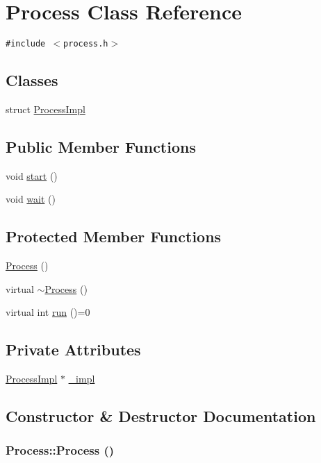 \hypertarget{classProcess}{
\section{Process Class Reference}
\label{classProcess}
}
{\tt \#include $<$process.h$>$}

\subsection*{Classes}
\begin{CompactItemize}
\item 
struct \hyperlink{structProcess_1_1ProcessImpl}{ProcessImpl}
\end{CompactItemize}
\subsection*{Public Member Functions}
\begin{CompactItemize}
\item 
void \hyperlink{classProcess_3fd7a51f79da17509af20d18a43c2f04}{start} ()
\item 
void \hyperlink{classProcess_3207d2d467391c0641eb3062b5d3a7d7}{wait} ()
\end{CompactItemize}
\subsection*{Protected Member Functions}
\begin{CompactItemize}
\item 
\hyperlink{classProcess_9f4553eac74c657bb451f390c17d6bea}{Process} ()
\item 
virtual \hyperlink{classProcess_990776d181dbbde7ff8ac12713d814b3}{$\sim$Process} ()
\item 
virtual int \hyperlink{classProcess_44aa79a79a8892c219b99582066530da}{run} ()=0
\end{CompactItemize}
\subsection*{Private Attributes}
\begin{CompactItemize}
\item 
\hyperlink{structProcess_1_1ProcessImpl}{ProcessImpl} $\ast$ \hyperlink{classProcess_8c1b2d11edde0fd78ece00c98f96155f}{\_\-impl}
\end{CompactItemize}


\subsection{Constructor \& Destructor Documentation}
\hypertarget{classProcess_9f4553eac74c657bb451f390c17d6bea}{
\subsubsection[{Process}]{\setlength{\rightskip}{0pt plus 5cm}Process::Process ()}}
\label{classProcess_9f4553eac74c657bb451f390c17d6bea}


